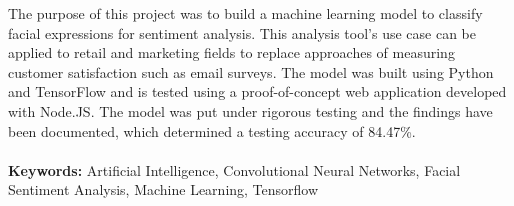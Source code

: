 

The purpose of this project was to build a machine learning model to classify facial expressions for sentiment analysis. This analysis tool's use case can be applied to retail and marketing fields to replace approaches of measuring customer satisfaction such as email surveys. The model was built using Python and TensorFlow and is tested using a proof-of-concept web application developed with Node.JS. The model was put under rigorous testing and the findings have been documented, which determined a testing accuracy of 84.47\%. \\ \\
\textbf{Keywords:} Artificial Intelligence, Convolutional Neural Networks, Facial Sentiment Analysis, Machine Learning, Tensorflow

